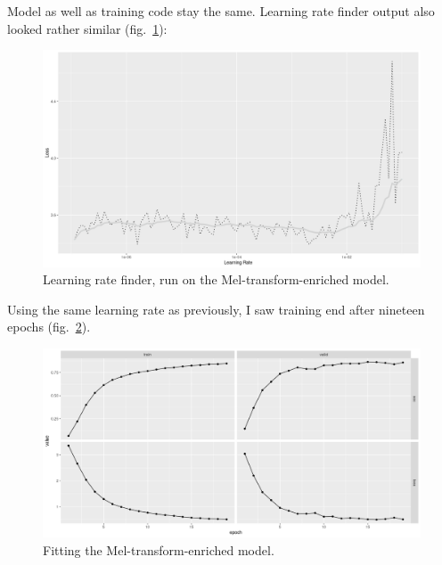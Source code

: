 \documentclass[
  letterpaper,
]{krantz}
\begin{document}
Model as well as training code stay the same. Learning rate finder
output also looked rather similar (fig.~\ref{fig-audio-lr-finder-mel}):

\begin{figure}[H]

{\centering \includegraphics{images/audio-lr-finder-mel.png}

}

\caption{\label{fig-audio-lr-finder-mel}Learning rate finder, run on the
Mel-transform-enriched model.}

\end{figure}

Using the same learning rate as previously, I saw training end after
nineteen epochs (fig.~\ref{fig-audio-fit-mel}).

\begin{figure}[H]

{\centering \includegraphics{images/audio-fit-mel.png}

}

\caption{\label{fig-audio-fit-mel}Fitting the Mel-transform-enriched
model.}

\end{figure}
\end{document}

